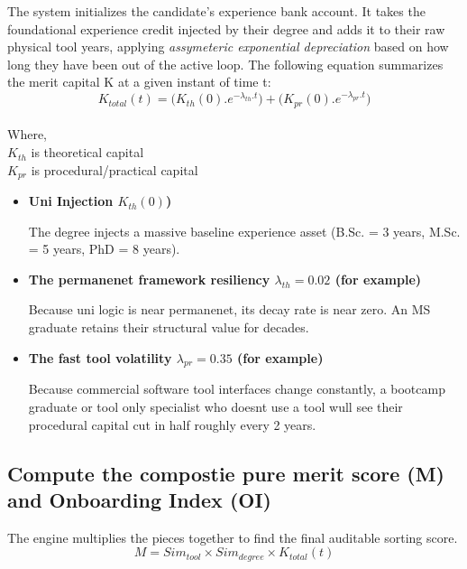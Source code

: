 \documentclass[a4paper, 12pt]{article}
\begin{document}
The system initializes the candidate's experience bank account. It takes the foundational experience credit injected by their degree and adds it to their raw physical tool years, applying \textit{assymeteric exponential depreciation} based on how long they have been out of the active loop. The following equation summarizes the merit capital K at a given instant of time t:
        \begin{equation}
            K_{total}(t) = \bigl(K_{th}(0) . e^{-\lambda_{th}.t}   \bigr) + \bigl(K_{pr}(0) . e^{-\lambda_{pr}.t}   \bigr)
        \end{equation}
\\ Where, \\
    $K_{th}$ is theoretical capital \\
    $K_{pr}$ is procedural/practical capital

\begin{itemize}
\item \textbf{Uni Injection $K_{th}(0)$)}

The degree injects a massive baseline experience asset (B.Sc. = 3 years, M.Sc. = 5 years, PhD = 8 years). \newpage

\item \textbf{The permanenet framework resiliency $\lambda_{th} = 0.02$ (for example)}

Because uni logic is near permanenet, its decay rate is near zero. An MS graduate retains their structural value for decades.

\item \textbf{The fast tool volatility $\lambda_{pr} = 0.35$ (for example)}

Because commercial software tool interfaces change constantly, a bootcamp graduate or tool only specialist who doesnt use a tool wull see their procedural capital cut in half roughly every 2 years.

\end{itemize}

\subsection{Compute the compostie pure merit score (M) and Onboarding Index (OI)}

The engine multiplies the pieces together to find the final auditable sorting score.
        \begin{equation}
            M = Sim_{tool} \times Sim_{degree} \times K_{total}(t)
        \end{equation}
\end{document}
